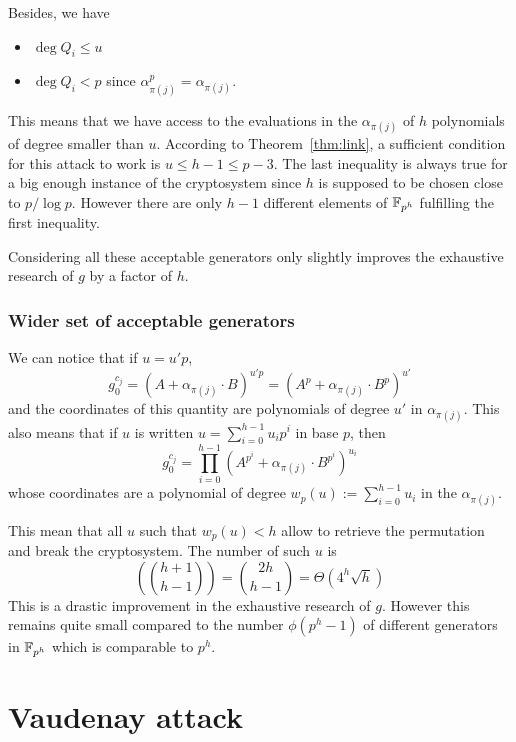 \documentclass[12pt,a4paper,titlepage]{article}
\newcommand{\GF}[1]{\F_{#1}}
\begin{document}
Besides, we have
\begin{itemize}
\item $\deg Q_i \leq u$
\item $\deg Q_i < p$ since $\alpha_{\pi(j)}^p = \alpha_{\pi(j)}$.
\end{itemize}

This means that we have access to the evaluations in the $\alpha_{\pi(j)}$ of $h$ polynomials of degree smaller than $u$. According to Theorem~\ref{thm:link}, a sufficient condition for this attack to work is $u \leq h-1 \leq p-3$. The last inequality is  always true for a big enough instance of the cryptosystem since $h$ is supposed to be chosen close to $p / \log p$. However there are only $h-1$ different elements of $\GF{p^h}$ fulfilling the first inequality.

Considering all these acceptable generators only slightly improves the exhaustive research of $g$ by a factor of $h$.


\subsubsection{Wider set of acceptable generators}

We can notice that if $u = u'p$,
$$ g_0^{c_j} = (A + \alpha_{\pi(j)} \cdot B)^{u'p} = (A^p + \alpha_{\pi(j)} \cdot B^p)^{u'} $$
and the coordinates of this quantity are polynomials of degree $u'$ in $\alpha_{\pi(j)}$.
This also means that if $u$ is written $u = \sum_{i=0}^{h-1} u_i p^i$ in base $p$, then
$$ g_0^{c_j} = \prod_{i=0}^{h-1} (A^{p^i} + \alpha_{\pi(j)} \cdot B^{p^i} )^{u_i} $$
whose coordinates are a polynomial of degree $w_p(u) := \sum_{i=0}^{h-1} u_i$ in the $\alpha_{\pi(j)}$.

This mean that all $u$ such that $w_p(u) < h$ allow to retrieve the permutation and break the cryptosystem.
The number of such $u$ is
$$ \left( \binom{h+1}{h-1} \right) = \binom{2h}{h-1} =\Theta\left( 4^h \sqrt{h} \right) $$
This is a drastic improvement in the exhaustive research of $g$. However this remains quite small compared to the number $\phi(p^h-1)$ of different generators in $\GF{p^h}$ which is comparable to $p^h$.




\newpage
\section{Vaudenay attack}
\label{sec:Vau}
\end{document}
